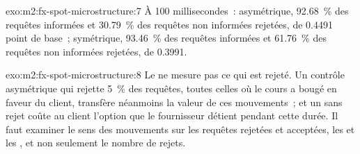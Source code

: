 \begin{solution}{exo:m2:fx-spot-microstructure:7}
À 100 millisecondes~: asymétrique, 92.68~\% des requêtes informées et 30.79~\% des requêtes non
informées rejetées,  de 0.4491 point de base~; symétrique, 93.46~\% des requêtes informées et
61.76~\% des requêtes non informées rejetées,  de 0.3991.
\end{solution}

\begin{solution}{exo:m2:fx-spot-microstructure:8}
Le  ne mesure pas ce qui est rejeté. Un contrôle asymétrique qui rejette
5~\% des requêtes, toutes celles où le cours a bougé en faveur du client, transfère
néanmoins la valeur de ces mouvements~; et un  sans rejet coûte au client
l'option que le fournisseur détient pendant cette durée. Il faut examiner le sens des
mouvements sur les requêtes rejetées et acceptées, les  et les ,
et non seulement le nombre de rejets.
\end{solution}


